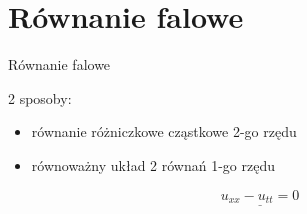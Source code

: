 \section{Równanie falowe}

\begin{frame}{Równanie falowe}
  \begin{block}{2 sposoby:}
\begin{itemize}    
\item równanie różniczkowe cząstkowe 2-go rzędu
\item równoważny układ 2 równań 1-go rzędu
\end{itemize}
  \end{block}
\begin{equation} \label{etykieta}\underline{u_{xx} - u_{tt} = 0} \end{equation}
\end{frame}

